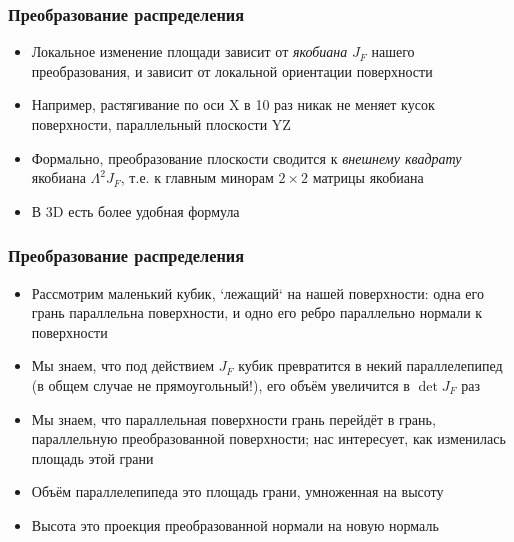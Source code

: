 \documentclass[10pt]{beamer}
\begin{document}
\begin{frame}
\frametitle{Преобразование распределения}
\begin{itemize}
\item Локальное изменение площади зависит от \textit{якобиана} \begin{math}J_F\end{math} нашего преобразования, и зависит от локальной ориентации поверхности
\pause
\item Например, растягивание по оси X в 10 раз никак не меняет кусок поверхности, параллельный плоскости YZ
\pause
\item Формально, преобразование плоскости сводится к \textit{внешнему квадрату} якобиана \begin{math}\Lambda^2 J_F\end{math}, т.е. к главным минорам \begin{math}2\times 2\end{math} матрицы якобиана
\pause
\item В 3D есть более удобная формула
\end{itemize}
\end{frame}

\begin{frame}
\frametitle{Преобразование распределения}
\begin{itemize}
\item Рассмотрим маленький кубик, `лежащий` на нашей поверхности: одна его грань параллельна поверхности, и одно его ребро параллельно нормали к поверхности
\pause
\item Мы знаем, что под действием \begin{math}J_F\end{math} кубик превратится в некий параллелепипед (в общем случае не прямоугольный!), его объём увеличится в \begin{math}\det J_F\end{math} раз
\pause
\item Мы знаем, что параллельная поверхности грань перейдёт в грань, параллельную преобразованной поверхности; нас интересует, как изменилась площадь этой грани
\pause
\item Объём параллелепипеда это площадь грани, умноженная на высоту
\pause
\item Высота это проекция преобразованной нормали на новую нормаль
\end{itemize}
\end{frame}
\end{document}
